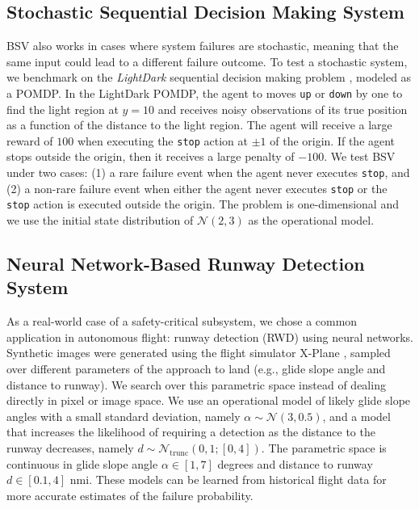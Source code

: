 \subsection{Stochastic Sequential Decision Making System}\label{sec:pomdp_example}
BSV also works in cases where system failures are stochastic, meaning that the same input could lead to a different failure outcome.
To test a stochastic system, we benchmark on the \textit{LightDark} sequential decision making problem \cite{platt2010belief}, modeled as a POMDP.
In the LightDark POMDP, the agent to moves \texttt{up} or \texttt{down} by one to find the light region at $y=10$ and receives noisy observations of its true position as a function of the distance to the light region.
The agent will receive a large reward of $100$ when executing the \texttt{stop} action at $\pm 1$ of the origin.
If the agent stops outside the origin, then it receives a large penalty of $-100$.
We test BSV under two cases: (1) a rare failure event when the agent never executes \texttt{stop}, and (2) a non-rare failure event when either the agent never executes \texttt{stop} or the \texttt{stop} action is executed outside the origin.
The problem is one-dimensional and we use the initial state distribution of $\mathcal{N}(2, 3)$ as the operational model.

\subsection{Neural Network-Based Runway Detection System}

As a real-world case of a safety-critical subsystem, we chose a common application in autonomous flight: runway detection (RWD) using neural networks.
Synthetic images were generated using the flight simulator X-Plane \cite{xplane}, sampled over different parameters of the approach to land (e.g., glide slope angle and distance to runway).
We search over this parametric space instead of dealing directly in pixel or image space.
We use an operational model of likely glide slope angles with a small standard deviation, namely $\alpha \sim \mathcal{N}(3, 0.5)$, and a model that increases the likelihood of requiring a detection as the distance to the runway decreases, namely $d \sim \mathcal{N}_\text{trunc}(0, 1; [0, 4])$.
The parametric space is continuous in glide slope angle $\alpha \in [1,7]$ degrees and distance to runway $d \in [0.1,4]$ nmi.
These models can be learned from historical flight data for more accurate estimates of the failure probability.

